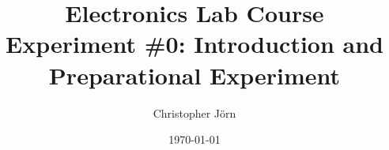 \title{Electronics Lab Course\\ Experiment \#0: Introduction and Preparational Experiment}
\author{Christopher J\"orn}
\date{\today}